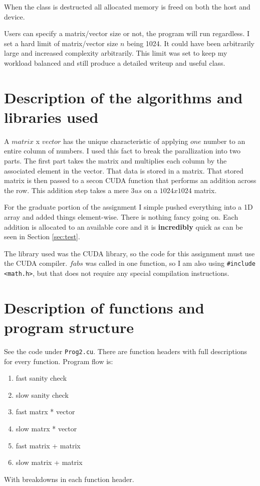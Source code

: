 \documentclass{article}
\begin{document}
When the class is destructed all allocated memory is freed on both the host and 
device.

Users can specify a matrix/vector size or not, the program will run regardless. 
I set a hard limit of matrix/vector size $n$ being 1024. It could have been 
arbitrarily large and increased complexity arbitrarily. This limit was set to 
keep my workload balanced and still produce a detailed writeup and useful 
class.


\section{Description of the algorithms and libraries used}
A $matrix$ x $vector$ has the unique characteristic of applying $one$ number to 
an entire column of numbers. I used this fact to break the parallization into 
two parts. The first part takes the matrix and multiplies each column by the 
associated element in the vector. That data is stored in a matrix. That stored 
matrix is then passed to a secon CUDA function that performs an addition across 
the row. This addition step takes a mere $3us$ on a $1024x1024$ matrix.

For the graduate portion of the assignment I simple pushed everything into a 1D 
array and added things element-wise. There is nothing fancy going on. Each 
addition is allocated to an available core and it is \textbf{incredibly} quick 
as can be seen in Section \ref{sec:test}.

The library used was the CUDA library, so the code for this assignment must use 
the CUDA compiler. $fabs$ was called in one function, so I am also using 
\verb|#include <math.h>|, but that does not require any special compilation 
instructions.


\section{Description of functions and program structure}
See the code under \verb|Prog2.cu|. There are function headers with full 
descriptions for every function. Program flow is:
\begin{enumerate}
    \item fast sanity check
    \item slow sanity check
    \item fast matrx * vector
    \item slow matrx * vector
    \item fast matrix + matrix
    \item slow matrix + matrix
\end{enumerate}
With breakdowns in each function header.
\end{document}
